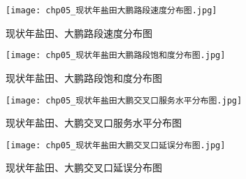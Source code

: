 \begin{figure}[!ht]
  \centering
  \texttt{[image: chp05\_现状年盐田大鹏路段速度分布图.jpg]}
  \caption{现状年盐田、大鹏路段速度分布图\label{fig:chp05_现状年盐田大鹏路段速度分布图.jpg} }
\end{figure}

\begin{figure}[!ht]
  \centering
  \texttt{[image: chp05\_现状年盐田大鹏路段饱和度分布图.jpg]}
  \caption{现状年盐田、大鹏路段饱和度分布图\label{fig:chp05_现状年盐田大鹏路段饱和度分布图} }
\end{figure}

\begin{figure}[!ht]
  \centering
  \texttt{[image: chp05\_现状年盐田大鹏交叉口服务水平分布图.jpg]}
  \caption{现状年盐田、大鹏交叉口服务水平分布图\label{fig:chp05_现状年盐田大鹏交叉口服务水平分布图} }
\end{figure}

\begin{figure}[!ht]
  \centering
  \texttt{[image: chp05\_现状年盐田大鹏交叉口延误分布图.jpg]}
  \caption{现状年盐田、大鹏交叉口延误分布图\label{fig:chp05_现状年盐田大鹏交叉口延误分布图} }
\end{figure}

\makeatletter
\setlength{\@fptop}{0pt}
\makeatother













